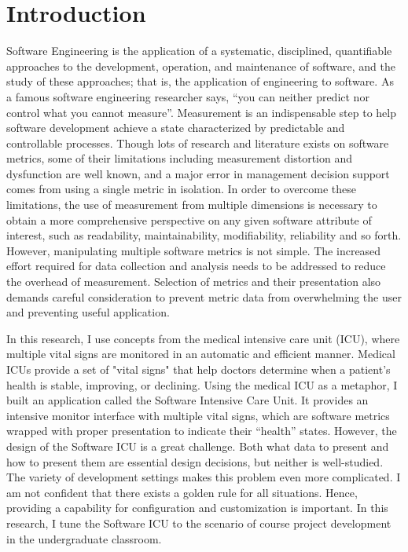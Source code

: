
\chapter{Introduction}
Software Engineering is the application of a systematic, disciplined, quantifiable approaches to the development, operation, and maintenance of software, and the study of these approaches; that is, the application of engineering to software\cite{se-def}. As a famous software engineering researcher says, ``you can neither predict nor control what you cannot measure''\cite{DeMarco}. Measurement is an indispensable step to help software development achieve a state characterized by predictable and controllable processes. Though lots of research and literature exists on software metrics, some of their limitations including measurement distortion and dysfunction are well known, and a major error in management decision support comes from using a single metric in isolation. In order to overcome these limitations, the use of measurement from multiple dimensions is necessary to obtain a more comprehensive perspective on any given software attribute of interest, such as readability, maintainability, modifiability, reliability and so forth\cite{metrics2004}\cite{multidimension2001}. However, manipulating multiple software metrics is not simple. The increased effort required for data collection and analysis needs to be addressed to reduce the overhead of measurement. Selection of metrics and their presentation also demands careful consideration to prevent metric data from overwhelming the user and preventing useful application. 

In this research, I use concepts from the medical intensive care unit (ICU), where multiple vital signs are monitored in an automatic and efficient manner. Medical ICUs provide a set of "vital signs" that help doctors determine when a patient's health is stable, improving, or declining. Using the medical ICU as a metaphor, I built an application called the Software Intensive Care Unit. It provides an intensive monitor interface with multiple vital signs, which are software metrics wrapped with proper presentation to indicate their ``health'' states. However, the design of the Software ICU is a great challenge. Both what data to present and how to present them are essential design decisions, but neither is well-studied. The variety of development settings makes this problem even more complicated. I am not confident that there exists a golden rule for all situations. Hence, providing a capability for configuration and customization is important. In this research, I tune the Software ICU to the scenario of course project development in the undergraduate classroom.

